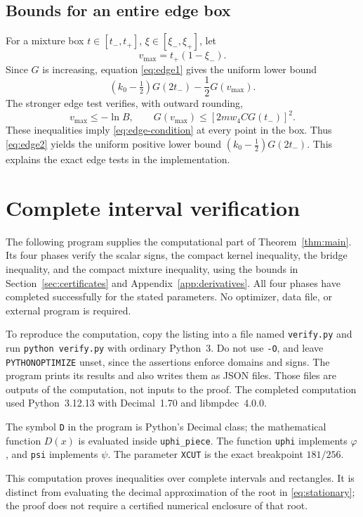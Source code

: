 \documentclass[11pt]{article}
\theoremstyle{remark}
\begin{document}
\subsection{Bounds for an entire edge box}
For a mixture box \(t\in[t_-,t_+]\),
\(\xi\in[\xi_-,\xi_+]\), let
\[
v_{\max}=t_+(1-\xi_-).
\]
Since \(G\) is increasing, equation \eqref{eq:edge1} gives the
uniform lower bound
\[
(k_0-\tfrac12)G(2t_-)-\frac12G(v_{\max}).
\]
The stronger edge test verifies, with outward rounding,
\[
v_{\max}\le-\ln B,\qquad
G(v_{\max})\le[2mw_4CG(t_-)]^2.
\]
These inequalities imply \eqref{eq:edge-condition} at every
point in the box. Thus \eqref{eq:edge2} yields the uniform positive
lower bound \((k_0-\tfrac12)G(2t_-)\).
This explains the exact edge tests in the implementation.



\clearpage
\section{Complete interval verification}\label{app:code}

The following program supplies the computational part of
Theorem~\ref{thm:main}. Its four phases verify the scalar signs,
the compact kernel inequality, the bridge inequality, and the compact
mixture inequality, using the bounds in
Section~\ref{sec:certificates} and Appendix~\ref{app:derivatives}.
All four phases have completed successfully for the stated parameters.
No optimizer, data file, or external program is required.

To reproduce the computation, copy the listing into a file named
\texttt{verify.py} and run \texttt{python verify.py} with ordinary
Python~3. Do not use \texttt{-O}, and leave \texttt{PYTHONOPTIMIZE}
unset, since the assertions enforce domains and signs.
The program prints its results and also writes them as JSON files.
Those files are outputs of the computation, not inputs to the proof.
The completed computation used Python~3.12.13 with Decimal~1.70
and libmpdec~4.0.0.

The symbol \texttt{D} in the program is Python's Decimal class;
the mathematical function \(D(x)\) is evaluated inside
\texttt{uphi\_piece}. The function \texttt{uphi} implements
\(\varphi\), and \texttt{psi} implements \(\psi\).
The parameter \texttt{XCUT} is the exact breakpoint \(181/256\).

This computation proves inequalities over complete intervals and
rectangles. It is distinct from evaluating the decimal approximation
of the root in \eqref{eq:stationary}; the proof does not require a
certified numerical enclosure of that root.
\end{document}
